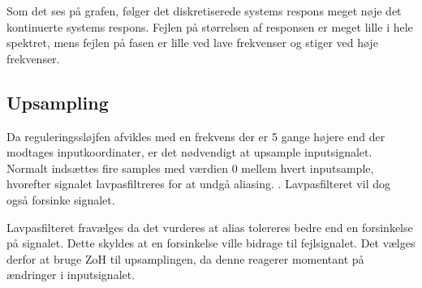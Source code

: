 Som det ses på grafen, følger det diskretiserede systems respons meget nøje det kontinuerte systems respons.
Fejlen på størrelsen af responsen er meget lille i hele spektret,
mens fejlen på fasen er lille ved lave frekvenser og stiger ved høje frekvenser.

\subsection{Upsampling}
\label{subsec:upsampling}

Da reguleringssløjfen afvikles med en frekvens der er 5 gange højere end der modtages inputkoordinater, er det nødvendigt at upsample inputsignalet. 
Normalt indsættes fire samples med værdien 0 mellem hvert inputsample, hvorefter signalet lavpasfiltreres for at undgå aliasing. \citep[s. 562]{dsp}. 
Lavpasfilteret vil dog også forsinke signalet. 



Lavpasfilteret fravælges da det vurderes at alias tolereres bedre end en forsinkelse på signalet. Dette skyldes at en forsinkelse ville bidrage til fejlsignalet. 
Det vælges derfor at bruge ZoH til upsamplingen, da denne reagerer momentant på ændringer i inputsignalet. 


